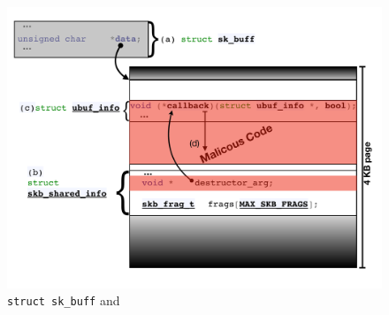 \begin{figure}
    \centering
    \includegraphics[width=1.1\linewidth]{figs/ubuf.pdf}
    \caption{\texttt{struct sk\_buff} and \shinfo}
    \label{fig:sh_info}
\end{figure}

